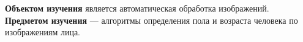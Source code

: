 {\bf Объектом изучения} является автоматическая обработка изображений. {\bf
Предметом изучения} --- алгоритмы определения пола и возраста человека по
изображениям лица.





